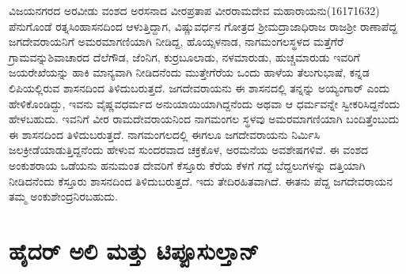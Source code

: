 ವಿಜಯನಗರದ ಅರವೀಡು ವಂಶದ ಅರಸನಾದ ವೀರಪ್ರತಾಪ ವೀರರಾಮದೇವ ಮಹಾರಾಯನು(1617\enginline{-}1632) ಪೆನುಗೊಂಡೆ ರತ್ನಸಿಂಹಾಸನದಿಂದ ಆಳುತ್ತಿದ್ದಾಗ, ವಿಷ್ಣುವರ್ಧನ ಗೋತ್ರದ ಶ‍್ರೀಮದ್ರಾಜಾಧಿರಾಜ ರಾಜಶ‍್ರೀ ರಾಣಾಪೆದ್ದ ಜಗದೇವರಾಯನಿಗೆ ಅಮರಮಾಗಣಿಯಾಗಿ ನೀಡಿದ್ದ, ಹೊಯ್ಸಳನಾಡ, ನಾಗಮಂಗಲಸ್ಥಳದ ಮತ್ತೆಗೆರೆ ಗ್ರಾಮವನ್ನು\break ಶಿವಾಚಾರದ ದೆಲೆಗೌಡ, ಜೆಂನಿಗ, ಕುರ್ರಬೂಲಾಡು, ನಳಮಾರುಡು, ಹುಚ್ಚಮಾರುಡು ಇವರಿಗೆ ಜಯರೇಖೆಯನ್ನು ಹಾಕಿ ಮಾನ್ಯವಾಗಿ ನೀಡಿದನೆಂದು ಮುತ್ತೇಗೆರೆಯ ಒಂದು ಹಾಳೆಯ ತೆಲುಗುಭಾಷೆ, ಕನ್ನಡ ಲಿಪಿಯಲ್ಲಿರುವ ಶಾಸನದಿಂದ ತಿಳಿದುಬರುತ್ತದೆ. ಜಗದೇವರಾಯನು ಈ ಶಾಸನದಲ್ಲಿ ತನ್ನನ್ನು ಅಯ್ಯಂಗಾರ್​ ಎಂದು ಹೇಳಿಕೊಂಡಿದ್ದು, ಇವನು ವೈಷ್ಣವಧರ್ಮದ ಅನುಯಾಯಿ\-ಯಾಗಿದ್ದನೆಂದು ಅಥವಾ ಆ ಧರ್ಮವನ್ನೇ ಸ್ವೀಕರಿಸಿದ್ದನೆಂದು ಹೇಳಬಹುದು. ಇವನಿಗೆ ವೀರ ರಾಮದೇವರಾಯನಿಂದ ನಾಗಮಂಗಲ ಸ್ಥಳವು ಅಮರಮಾಗಣಿಯಾಗಿ ಬಂದಿತ್ತೆಂಬುದು ಈ ಶಾಸನದಿಂದ ತಿಳಿದುಬರುತ್ತದೆ. ನಾಗಮಂಗಲದಲ್ಲಿ ಈಗಲೂ ಜಗದೇವರಾಯನು ನಿರ್ಮಿಸಿ ಜಲಕ್ರೀಡೆಯಾಡುತ್ತಿದ್ದನೆಂದು ಹೇಳುವ ಸುಂದರವಾದ ಚಕ್ರಕೊಳ, ಅರಮನೆಯ ಅವಶೇಷಗಳಿವೆ. ಈ ವಂಶದ ಅಂಕುಶರಾಯ ಒಡೆಯನು ಹನುಮಂತ ದೇವರಿಗೆ ಕೆಸ್ತೂರು ಕೆರೆಯ ಕೆಳಗೆ ಗದ್ದೆ ಬೆದ್ದಲುಗಳನ್ನು ದತ್ತಿಯಾಗಿ ನೀಡಿದನೆಂದು ಕೆಸ್ತೂರು ಶಾಸನದಿಂದ ತಿಳಿದುಬರುತ್ತದೆ. ಇದು ತೇದಿರಹಿತವಾಗಿದೆ. ಈತನು ಪೆದ್ದ ಜಗದೇವರಾಯನ ತಮ್ಮ ಅಂಕುಶೇಂದ್ರನಿರಬಹುದು.

\section*{ಹೈದರ್​ ಅಲಿ ಮತ್ತು ಟಿಪ್ಪೂಸುಲ್ತಾನ್​}


